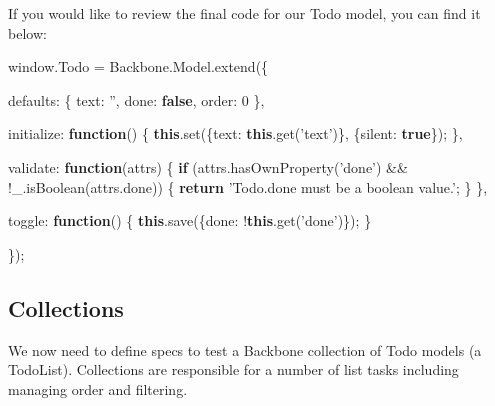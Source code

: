 \documentclass[9pt]{book}
\newenvironment{Shaded}{}{}
\newcommand{\KeywordTok}[1]{\textcolor[rgb]{0.00,0.44,0.13}{\textbf{{#1}}}}
\newcommand{\DataTypeTok}[1]{\textcolor[rgb]{0.56,0.13,0.00}{{#1}}}
\newcommand{\DecValTok}[1]{\textcolor[rgb]{0.25,0.63,0.44}{{#1}}}
\newcommand{\StringTok}[1]{\textcolor[rgb]{0.25,0.44,0.63}{{#1}}}
\newcommand{\OtherTok}[1]{\textcolor[rgb]{0.00,0.44,0.13}{{#1}}}
\newcommand{\FunctionTok}[1]{\textcolor[rgb]{0.02,0.16,0.49}{{#1}}}
\newcommand{\NormalTok}[1]{{#1}}
\begin{document}
If you would like to review the final code for our Todo model, you can
find it below:

\begin{Shaded}
\begin{Highlighting}[]

\OtherTok{window}\NormalTok{.}\FunctionTok{Todo} \NormalTok{= }\OtherTok{Backbone}\NormalTok{.}\OtherTok{Model}\NormalTok{.}\FunctionTok{extend}\NormalTok{(\{}

    \DataTypeTok{defaults}\NormalTok{: \{}
      \DataTypeTok{text}\NormalTok{: }\StringTok{''}\NormalTok{,}
      \DataTypeTok{done}\NormalTok{:  }\KeywordTok{false}\NormalTok{,}
      \DataTypeTok{order}\NormalTok{: }\DecValTok{0}
    \NormalTok{\},}

    \DataTypeTok{initialize}\NormalTok{: }\KeywordTok{function}\NormalTok{() \{}
        \KeywordTok{this}\NormalTok{.}\FunctionTok{set}\NormalTok{(\{}\DataTypeTok{text}\NormalTok{: }\KeywordTok{this}\NormalTok{.}\FunctionTok{get}\NormalTok{(}\StringTok{'text'}\NormalTok{)\}, \{}\DataTypeTok{silent}\NormalTok{: }\KeywordTok{true}\NormalTok{\});}
    \NormalTok{\},}

    \DataTypeTok{validate}\NormalTok{: }\KeywordTok{function}\NormalTok{(attrs) \{}
        \KeywordTok{if} \NormalTok{(}\OtherTok{attrs}\NormalTok{.}\FunctionTok{hasOwnProperty}\NormalTok{(}\StringTok{'done'}\NormalTok{) && !}\OtherTok{_}\NormalTok{.}\FunctionTok{isBoolean}\NormalTok{(}\OtherTok{attrs}\NormalTok{.}\FunctionTok{done}\NormalTok{)) \{}
            \KeywordTok{return} \StringTok{'Todo.done must be a boolean value.'}\NormalTok{;}
        \NormalTok{\}}
    \NormalTok{\},}

    \DataTypeTok{toggle}\NormalTok{: }\KeywordTok{function}\NormalTok{() \{}
        \KeywordTok{this}\NormalTok{.}\FunctionTok{save}\NormalTok{(\{}\DataTypeTok{done}\NormalTok{: !}\KeywordTok{this}\NormalTok{.}\FunctionTok{get}\NormalTok{(}\StringTok{'done'}\NormalTok{)\});}
    \NormalTok{\}}

\NormalTok{\});}
\end{Highlighting}
\end{Shaded}

\subsection{Collections}\label{collections-1}

We now need to define specs to test a Backbone collection of Todo models
(a TodoList). Collections are responsible for a number of list tasks
including managing order and filtering.
\end{document}
